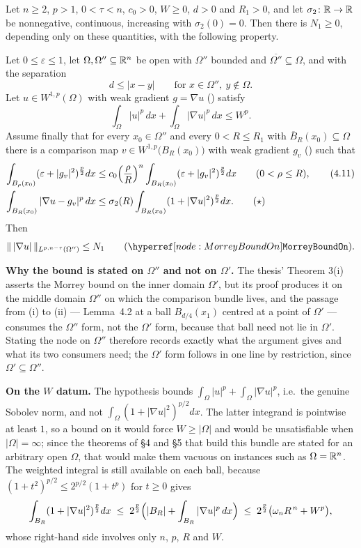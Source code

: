 \begin{helper}
Let $n\ge2$, $p>1$, $0<\tau<n$, $c_0>0$, $W\ge0$, $d>0$ and $R_1>0$, and let
$\sigma_2\colon\mathbb{R}\to\mathbb{R}$ be nonnegative, continuous, increasing with
$\sigma_2(0)=0$.  Then there is $N_1\ge0$, depending only on these quantities,
with the following property.

Let $0\le\varepsilon\le1$, let $\Omega,\Omega''\subseteq\mathbb{R}^n$ be open with
$\Omega''$ bounded and $\overline{\Omega''}\subseteq\Omega$, and with the
separation
\[
d\le|x-y|\qquad\text{for }x\in\Omega'',\ y\notin\Omega .
\]
Let $u\in W^{1,p}(\Omega)$ with weak gradient $g=\nabla u$
() satisfy
\[
\int_\Omega|u|^p\,dx+\int_\Omega|\nabla u|^p\,dx\le W^p .
\]
Assume finally that for every $x_0\in\Omega''$ and every $0<R\le R_1$ with
$\overline B_R(x_0)\subseteq\Omega$ there is a comparison map
$v\in W^{1,p}\bigl(B_R(x_0)\bigr)$ with weak gradient $g_v$
() such that
\begin{align}
\int_{B_\rho(x_0)}(\varepsilon+|g_v|^2)^{\frac p2}dx
&\le c_0\Bigl(\frac\rho R\Bigr)^{n}\int_{B_R(x_0)}(\varepsilon+|g_v|^2)^{\frac p2}dx
\qquad(0<\rho\le R),\tag{4.11}\\
\int_{B_R(x_0)}|\nabla u-g_v|^p\,dx
&\le\sigma_2(R)\int_{B_R(x_0)}(1+|\nabla u|^2)^{\frac p2}dx .\tag{$\star$}
\end{align}
Then
\[
\|\,|\nabla u|\,\|_{L^{p,n-\tau}(\Omega'')}\le N_1
\qquad(\noderef{MorreyBoundOn}).
\]

\noindent\textbf{Why the bound is stated on $\Omega''$ and not on $\Omega'$.}
The thesis' Theorem 3(i) asserts the Morrey bound on the inner domain
$\Omega'$, but its proof produces it on the middle domain $\Omega''$ on which
the comparison bundle lives, and the passage from (i) to (ii) --- Lemma~4.2 at
a ball $B_{d/4}(x_1)$ centred at a point of $\Omega'$ --- consumes the
$\Omega''$ form, not the $\Omega'$ form, because that ball need not lie in
$\Omega'$.  Stating the node on $\Omega''$ therefore records exactly what the
argument gives and what its two consumers need; the $\Omega'$ form follows in
one line by restriction, since $\Omega'\subseteq\Omega''$.

\noindent\textbf{On the $W$ datum.}  The hypothesis bounds
$\int_\Omega|u|^p+\int_\Omega|\nabla u|^p$, i.e.\ the genuine Sobolev norm, and
not $\int_\Omega(1+|\nabla u|^2)^{p/2}dx$.  The latter integrand is pointwise at
least $1$, so a bound on it would force $W\ge|\Omega|$ and would be
unsatisfiable when $|\Omega|=\infty$; since the theorems of \S4 and \S5 that
build this bundle are stated for an arbitrary open $\Omega$, that would make
them vacuous on instances such as $\Omega=\mathbb{R}^n$.  The weighted integral is
still available on each ball, because $(1+t^2)^{p/2}\le2^{p/2}(1+t^p)$ for
$t\ge0$ gives
\[
\int_{B_R}(1+|\nabla u|^2)^{\frac p2}dx
\;\le\;2^{\frac p2}\Bigl(|B_R|+\int_{B_R}|\nabla u|^p\,dx\Bigr)
\;\le\;2^{\frac p2}\bigl(\omega_nR^{\,n}+W^p\bigr),
\]
whose right-hand side involves only $n$, $p$, $R$ and $W$.


\end{helper}
